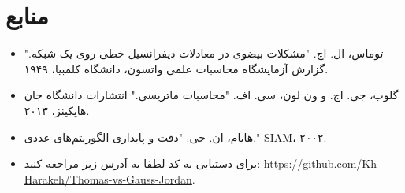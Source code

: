 \documentclass[a4paper,12pt]{article}
\begin{document}
\section*{منابع}
\begin{itemize}
    \item توماس، ال. اچ. "مشکلات بیضوی در معادلات دیفرانسیل خطی روی یک شبکه." گزارش آزمایشگاه محاسبات علمی واتسون، دانشگاه کلمبیا، ۱۹۴۹.
    \item گلوب، جی. اچ. و ون لون، سی. اف. "محاسبات ماتریسی." انتشارات دانشگاه جان هاپکینز، ۲۰۱۳.
    \item هایام، ان. جی. "دقت و پایداری الگوریتم‌های عددی." SIAM، ۲۰۰۲.
    \item برای دستیابی به کد لطفا به آدرس زیر مراجعه کنید: \url{https://github.com/Kh-Harakeh/Thomas-vs-Gauss-Jordan}.
\end{itemize}
\end{document}
